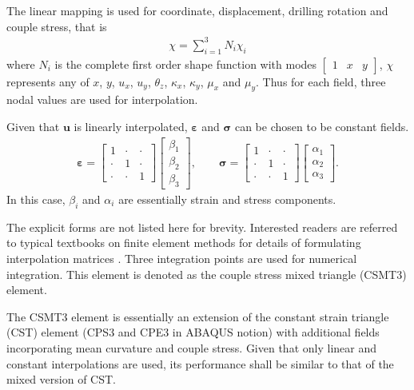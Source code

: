 \documentclass[3p,sort&compress,11pt,fleqn,review]{elsarticle}
\newcommand*{\mb}[1]{\boldsymbol{#1}}
\begin{document}
The linear mapping is used for coordinate, displacement, drilling rotation and couple stress, that is
\begin{gather}
\chi=\sum_{i=1}^3N_i\chi_i
\end{gather}
where $N_i$ is the complete first order shape function with modes $\begin{bmatrix}
1&x&y
\end{bmatrix}$, $\chi$ represents any of $x$, $y$, $u_x$, $u_y$, $\theta_z$, $\kappa_x$, $\kappa_y$, $\mu_x$ and $\mu_y$. Thus for each field, three nodal values are used for interpolation.

Given that $\mb{u}$ is linearly interpolated, $\mb{\varepsilon}$ and $\mb{\sigma}$ can be chosen to be constant fields.
\begin{gather}
\mb{\varepsilon}=\begin{bmatrix}
1&\cdot&\cdot\\\cdot&1&\cdot\\\cdot&\cdot&1
\end{bmatrix}\begin{bmatrix}
\beta_1\\\beta_2\\\beta_3
\end{bmatrix},\qquad
\mb{\sigma}=\begin{bmatrix}
1&\cdot&\cdot\\\cdot&1&\cdot\\\cdot&\cdot&1
\end{bmatrix}\begin{bmatrix}
\alpha_1\\\alpha_2\\\alpha_3
\end{bmatrix}.
\end{gather}
In this case, $\beta_i$ and $\alpha_i$ are essentially strain and stress components.

The explicit forms are not listed here for brevity. Interested readers are referred to typical textbooks on finite element methods for details of formulating interpolation matrices \citep[see, e.g.,][section 5.1.3.1]{Zienkiewicz2013}. Three integration points are used for numerical integration. This element is denoted as the couple stress mixed triangle (CSMT3) element.

The CSMT3 element is essentially an extension of the constant strain triangle (CST) element (CPS3 and CPE3 in ABAQUS notion) with additional fields incorporating mean curvature and couple stress. Given that only linear and constant interpolations are used, its performance shall be similar to that of the mixed version of CST.
\end{document}
